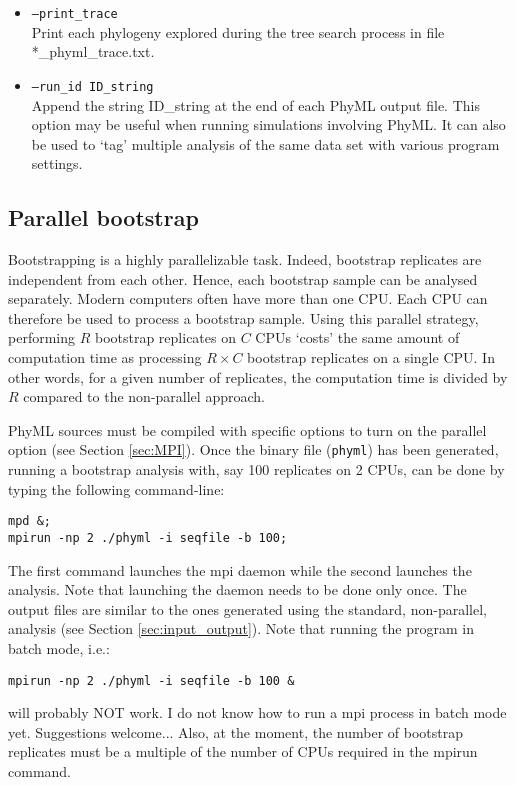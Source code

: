 \documentclass[a4paper,12pt]{article}
\newcommand{\x}[1]{\texttt{#1}}
\begin{document}
\begin{itemize}
\item \x{--print\_trace} \\
Print each phylogeny explored during the tree search process in file *\_phyml\_trace.txt.

\item \x{--run\_id ID\_string} \\
Append the string ID\_string at the end of each PhyML output file. This option may be useful when
running simulations involving PhyML. It can also be used to `tag' multiple analysis of the same data
set with various program settings.

\end{itemize}

  
\subsection{Parallel  bootstrap}\label{sec:parallel_bootstrap}

Bootstrapping is  a highly  parallelizable task. Indeed,  bootstrap replicates are  independent from
each other.   Hence, each bootstrap sample can  be analysed separately. Modern  computers often have
more than one CPU. Each CPU can therefore be used to process a bootstrap sample. Using this parallel
strategy, performing  $R$ bootstrap replicates  on $C$ CPUs  `costs' the same amount  of computation
time as processing $R  \times C$ bootstrap replicates on a single CPU.  In  other words, for a given
number of replicates, the computation time is divided by $R$ compared to the non-parallel approach.

PhyML sources  must be compiled with  specific options to turn  on the parallel  option (see Section
\ref{sec:MPI}). Once  the binary file (\x{phyml})  has been generated, running  a bootstrap analysis
with, say 100 replicates on 2 CPUs, can be done by typing the following command-line:
\begin{verbatim}
mpd &;
mpirun -np 2 ./phyml -i seqfile -b 100;
\end{verbatim} 
The  first command  launches  the mpi  daemon  while the  second launches  the  analysis. Note  that
launching the daemon needs to be done only once.  The output files are similar to the ones generated
using the standard, non-parallel, analysis (see Section \ref{sec:input_output}). Note that running 
the program in batch mode, i.e.:
\begin{verbatim}
mpirun -np 2 ./phyml -i seqfile -b 100 &
\end{verbatim} 
will probably NOT work. I do not know how to run a mpi process in batch mode yet. Suggestions welcome...
Also, at the moment, the number of bootstrap replicates must be a multiple of the number of CPUs
required in the mpirun command.
\end{document}
